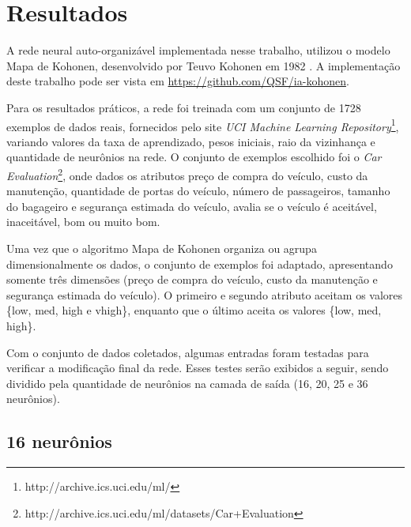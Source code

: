 \section{Resultados}
A rede neural auto-organizável implementada nesse trabalho, utilizou o modelo Mapa de Kohonen, desenvolvido por
Teuvo Kohonen em 1982 \cite{Kohonen}. A implementação deste trabalho pode ser vista em \url{https://github.com/QSF/ia-kohonen}.

Para os resultados práticos, a rede foi treinada com um conjunto de 1728 exemplos de dados reais, fornecidos pelo site \textit{UCI Machine Learning Repository}\footnote{http://archive.ics.uci.edu/ml/}, variando valores da taxa de aprendizado, pesos iniciais, raio da vizinhança e quantidade de neurônios na rede. O conjunto de exemplos escolhido foi o \textit{Car Evaluation}\footnote{http://archive.ics.uci.edu/ml/datasets/Car+Evaluation}, onde dados os atributos preço de compra do veículo, custo da manutenção, quantidade de portas do veículo, número de passageiros, tamanho do bagageiro e segurança estimada do veículo, avalia se o veículo é aceitável, inaceitável, bom ou muito bom.

Uma vez que o algoritmo Mapa de Kohonen organiza ou agrupa dimensionalmente os dados, o conjunto de exemplos foi adaptado, apresentando somente três dimensões (preço de compra do veículo, custo da manutenção e segurança estimada do veículo). O primeiro e segundo atributo aceitam os valores \{low, med, high e vhigh\}, enquanto que o último aceita os valores \{low, med, high\}.

Com o conjunto de dados coletados, algumas entradas foram testadas para verificar a modificação final da rede. Esses testes serão exibidos a seguir, sendo dividido pela quantidade de neurônios na camada de saída (16, 20, 25 e 36 neurônios).

\subsection{16 neurônios} %
\label{sub:16_neuronios}

